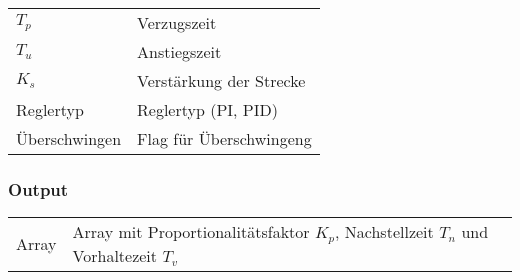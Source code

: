 \begin{tabular}{p{40mm}l}
    $ T_p $             & Verzugszeit \\
    $ T_u $             & Anstiegszeit \\
    $ K_s $             & Verst\"arkung der Strecke \\
      Reglertyp         & Reglertyp (PI, PID) \\
    \"Uberschwingen     & Flag f\"ur \"Uberschwingeng %
\end{tabular}

\subsubsection*{Output}
\begin{tabular}{p{40mm}l}
    Array & \parbox[t][4em][s]{0.7\textwidth}{Array mit Proportionalit\"atsfaktor $K_p$, Nachstellzeit $T_n$ und Vorhaltezeit $T_v$}
\end{tabular}

